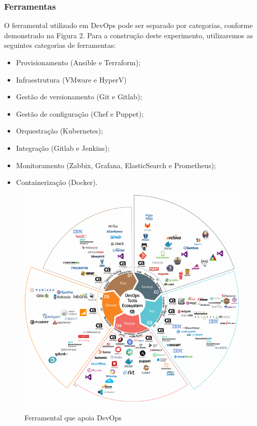 \documentclass[twoside,english,brazilian]{UNISINOSartigo}
\begin{document}
\subsubsection{Ferramentas}
O ferramental utilizado em DevOps pode ser separado por categorias, conforme demonstrado na Figura 2. Para a construção deste experimento, utilizaremos as seguintes categorias de ferramentas:
\begin{itemize}
\item Provisionamento (Ansible e Terraform);
\item Infraestrutura (VMware e HyperV)
\item Gestão de versionamento (Git e Gitlab);
\item Gestão de configuração (Chef e Puppet);
\item Orquestração (Kubernetes);
\item Integração (Gitlab e Jenkins);
\item Monitoramento (Zabbix, Grafana, ElasticSearch e Prometheus);
\item Containerização (Docker).
\end{itemize}
\begin{figure}[h]
    \centering
    \includegraphics[scale=.7]{imagens/devops11.png}
    \caption{Ferramental que apoia DevOps}
    \label{fig:DevOpsTools}
\end{figure}
\end{document}
